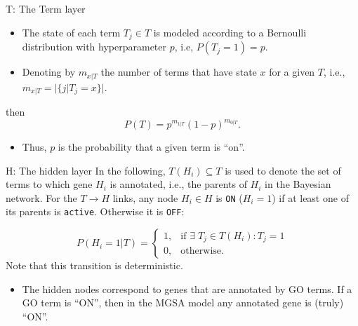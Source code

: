 \documentclass{beamer}
\newcommand{\numberofterms}[2][|T]{m_{#2#1}}
\newcommand{\ifgenehasactiveterm}{\text{if } \exists \; T_j \in T(H_i): T_j=1}
\begin{document}
\begin{frame}{T: The Term layer}

\begin{itemize}
 \item  The state of each term $T_j\in T$ is modeled according to a Bernoulli
distribution with hyperparameter $p$, i.e, $P(T_j=1)=p$. 
\item Denoting by
$\numberofterms{x}$ the number of terms that have state $x$ for a given $T$,
i.e., $\numberofterms{x}=|\{j|T_j=x\}|$. 
\end{itemize}

then
\begin{equation}
 P(T) = p^{\numberofterms{1}}(1-p)^{\numberofterms{0}}.
\label{eqn:prior}
\end{equation}
\begin{itemize}
 \item Thus, $p$ is the probability that a given term is ``on''.
\end{itemize}


\end{frame}

\begin{frame}{H: The hidden layer}
 In the following, $T(H_i) \subseteq T$ is used to denote the set of
terms to which gene $H_i$ is annotated, i.e., the parents of $H_i$ in
the Bayesian network. For
the $T \rightarrow H$ links, any node $H_i \in H$ is \texttt{ON}
($H_i=1$) if at least one of its parents is \texttt{active}. Otherwise it
is \texttt{OFF}:

\begin{equation}
P(H_i=1|T) = \begin{cases}1, & \ifgenehasactiveterm \\ 0, &
\text{otherwise.} \end{cases}
\label{eqn:lpd.hidden.given.t}
\end{equation}
Note that this transition is deterministic.

\begin{itemize}
 \item The hidden nodes correspond to genes that are annotated by GO terms. If a GO term is ``ON'', 
then in the MGSA model any annotated gene is (truly) ``ON''.
\end{itemize}



\end{frame}
\end{document}
